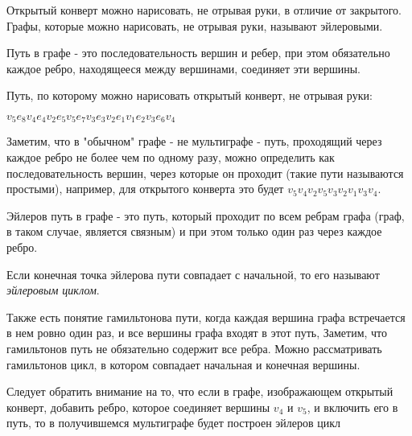 \documentclass[russian]{lecture-notes}
\begin{document}
Открытый конверт можно нарисовать, не отрывая руки, в отличие от закрытого. Графы, которые можно нарисовать, не отрывая руки, называют эйлеровыми.

\begin{definition}
    Путь в графе - это последовательность вершин и ребер, при этом обязательно каждое ребро, находящееся между вершинами, соединяет эти вершины.
\end{definition}

Путь, по которому можно нарисовать открытый конверт, не отрывая руки: 

$v_5 e_8 v_4 e_4 v_2 e_5 v_5 e_7 v_3 e_3 v_2 e_1 v_1 e_2 v_3 e_6 v_4$

Заметим, что в "обычном" графе - не мультиграфе - путь, проходящий через каждое ребро не более чем по одному разу, можно определить как последовательность вершин, через которые он проходит (такие пути называются простыми), например, для открытого конверта это будет $v_5 v_4 v_2 v_5 v_3 v_2 v_1 v_3 v_4$.

\begin{definition}
    Эйлеров путь в графе - это путь, который проходит по всем ребрам графа (граф, в таком случае, является связным) и при этом только один раз через каждое ребро.
\end{definition}

\begin{note}
    Если конечная точка эйлерова пути совпадает с начальной, то его называют \emph{эйлеровым циклом}.
\end{note}

Также есть понятие гамильтонова пути, когда каждая вершина графа встречается в нем ровно один раз, и все вершины графа входят в этот путь, Заметим, что гамильтонов путь не обязательно содержит все ребра. Можно рассматривать гамильтонов цикл, в котором совпадает начальная и конечная вершины.

Следует обратить внимание на то, что если в графе, изображающем открытый конверт, добавить ребро, которое соединяет вершины $v_4$ и $v_5$, и включить его в путь, то в получившемся мультиграфе будет построен эйлеров цикл

\end{document}
